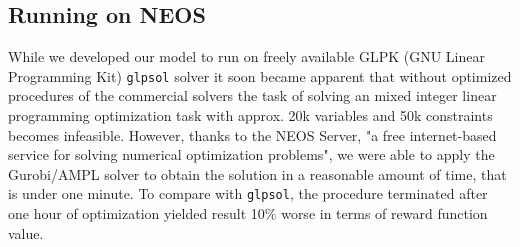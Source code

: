 \subsection{Running on NEOS}

While we developed our model to run on freely available GLPK (GNU Linear Programming Kit) \texttt{glpsol} solver it soon became apparent that without optimized procedures of the commercial solvers the task of solving an mixed integer linear programming optimization task with approx. 20k variables and 50k constraints becomes infeasible. However, thanks to the NEOS Server, "a free internet-based service for solving numerical optimization problems", we were able to apply the Gurobi/AMPL solver to obtain the solution in a reasonable amount of time, that is under one minute. To compare with \texttt{glpsol}, the procedure terminated after one hour of optimization yielded result 10\% worse in terms of reward function value.
